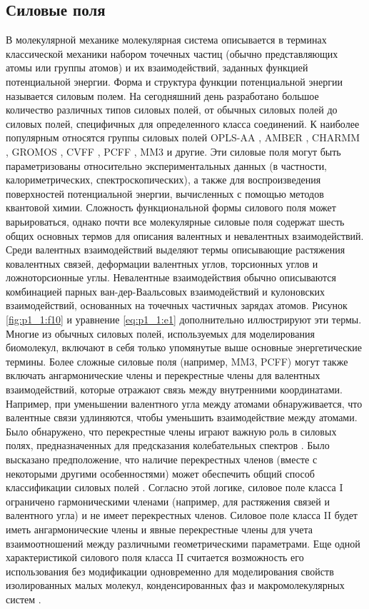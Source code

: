 \subsection{Силовые поля}
В молекулярной механике молекулярная система описывается в терминах классической механики набором точечных частиц (обычно представляющих атомы или группы атомов) и их взаимодействий, заданных функцией потенциальной энергии. Форма и структура функции потенциальной энергии называется силовым полем. На сегодняшний день разработано большое количество различных типов силовых полей, от обычных силовых полей до силовых полей, специфичных для определенного класса соединений. К наиболее популярным относятся группы силовых полей OPLS-AA \cite{jorgensen_development_1998}, AMBER \cite{cornell_2nd_1995}, CHARMM \cite{mackerell_all-atom_1998}, GROMOS \cite{schuler_improved_2001} , CVFF \cite{dauber-osguthorpe_structure_1988}, PCFF \cite{sun_force_1994}, MM3 \cite{allinger_molecular_1989} и другие. Эти силовые поля могут быть параметризованы относительно экспериментальных данных (в частности, калориметрических, спектроскопических), а также для воспроизведения поверхностей потенциальной энергии, вычисленных с помощью методов квантовой химии. Сложность функциональной формы силового поля может варьироваться, однако почти все молекулярные силовые поля содержат шесть общих основных термов для описания валентных и невалентных взаимодействий. Среди валентных взаимодействий выделяют термы описывающие растяжения ковалентных связей, деформации валентных углов, торсионных углов и ложноторсионные углы. Невалентные взаимодействия обычно описываются комбинацией парных ван-дер-Ваальсовых взаимодействий и кулоновских взаимодействий, основанных на точечных частичных зарядах атомов. Рисунок \ref{fig:p1_1:f10} и уравнение \ref{eq:p1_1:e1} дополнительно иллюстрируют эти термы. Многие из обычных силовых полей, используемых для моделирования биомолекул, включают в себя только упомянутые выше основные энергетические термины. Более сложные силовые поля (например, MM3, PCFF) могут также включать ангармонические члены и перекрестные члены для валентных взаимодействий, которые отражают связь между внутренними координатами. Например, при уменьшении валентного угла между атомами обнаруживается, что валентные связи удлиняются, чтобы уменьшить взаимодействие между атомами. Было обнаружено, что перекрестные члены играют важную роль в силовых полях, предназначенных для предсказания колебательных спектров  \cite{leach_molecular_2001}. Было высказано предположение, что наличие перекрестных членов (вместе с некоторыми другими особенностями) может обеспечить общий способ классификации силовых полей \cite{hwang_derivation_1994}. Согласно этой логике, силовое поле класса I ограничено гармоническими членами (например, для растяжения связей и валентного угла) и не имеет перекрестных членов. Силовое поле класса II будет иметь ангармонические члены и явные перекрестные члены для учета взаимоотношений между различными геометрическими параметрами. Еще одной характеристикой силового поля класса II считается возможность его использования без модификации одновременно для моделирования свойств изолированных малых молекул, конденсированных фаз и макромолекулярных систем \cite{leach_molecular_2001}.
